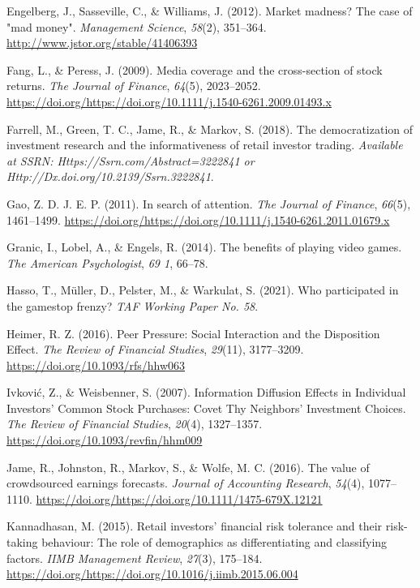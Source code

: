 \documentclass[12pt,]{article}
\begin{document}
\leavevmode\hypertarget{ref-engelberg2012}{}%
Engelberg, J., Sasseville, C., \& Williams, J. (2012). Market madness?
The case of "mad money". \emph{Management Science}, \emph{58}(2),
351--364. \url{http://www.jstor.org/stable/41406393}

\leavevmode\hypertarget{ref-fang2009}{}%
Fang, L., \& Peress, J. (2009). Media coverage and the cross-section of
stock returns. \emph{The Journal of Finance}, \emph{64}(5), 2023--2052.
\url{https://doi.org/https://doi.org/10.1111/j.1540-6261.2009.01493.x}

\leavevmode\hypertarget{ref-farrell2018}{}%
Farrell, M., Green, T. C., Jame, R., \& Markov, S. (2018). The
democratization of investment research and the informativeness of retail
investor trading. \emph{Available at SSRN:
Https://Ssrn.com/Abstract=3222841 or
Http://Dx.doi.org/10.2139/Ssrn.3222841}.

\leavevmode\hypertarget{ref-da2011}{}%
Gao, Z. D. J. E. P. (2011). In search of attention. \emph{The Journal of
Finance}, \emph{66}(5), 1461--1499.
\url{https://doi.org/https://doi.org/10.1111/j.1540-6261.2011.01679.x}

\leavevmode\hypertarget{ref-granic2014}{}%
Granic, I., Lobel, A., \& Engels, R. (2014). The benefits of playing
video games. \emph{The American Psychologist}, \emph{69 1}, 66--78.

\leavevmode\hypertarget{ref-hasso2021}{}%
Hasso, T., Müller, D., Pelster, M., \& Warkulat, S. (2021). Who
participated in the gamestop frenzy? \emph{TAF Working Paper No. 58}.

\leavevmode\hypertarget{ref-heimer2016}{}%
Heimer, R. Z. (2016). Peer Pressure: Social Interaction and the
Disposition Effect. \emph{The Review of Financial Studies},
\emph{29}(11), 3177--3209. \url{https://doi.org/10.1093/rfs/hhw063}

\leavevmode\hypertarget{ref-ivkovic2007}{}%
Ivković, Z., \& Weisbenner, S. (2007). Information Diffusion Effects in
Individual Investors' Common Stock Purchases: Covet Thy Neighbors'
Investment Choices. \emph{The Review of Financial Studies},
\emph{20}(4), 1327--1357. \url{https://doi.org/10.1093/revfin/hhm009}

\leavevmode\hypertarget{ref-jame2016}{}%
Jame, R., Johnston, R., Markov, S., \& Wolfe, M. C. (2016). The value of
crowdsourced earnings forecasts. \emph{Journal of Accounting Research},
\emph{54}(4), 1077--1110.
\url{https://doi.org/https://doi.org/10.1111/1475-679X.12121}

\leavevmode\hypertarget{ref-kannadhasan2015}{}%
Kannadhasan, M. (2015). Retail investors' financial risk tolerance and
their risk-taking behaviour: The role of demographics as differentiating
and classifying factors. \emph{IIMB Management Review}, \emph{27}(3),
175--184.
\url{https://doi.org/https://doi.org/10.1016/j.iimb.2015.06.004}
\end{document}
